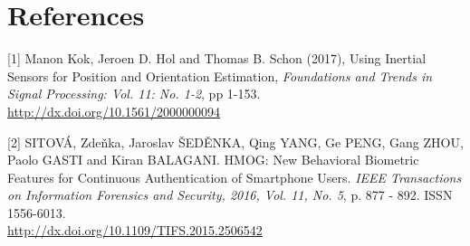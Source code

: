 \documentclass{article}
\begin{document}


\section*{References}

\small

[1] Manon Kok, Jeroen D. Hol and Thomas B. Schon (2017), Using
Inertial Sensors for Position and Orientation Estimation,
{\it Foundations and Trends in Signal Processing: Vol. 11: No. 1-2},
pp 1-153. \\ \url{http://dx.doi.org/10.1561/2000000094}

[2] SITOVÁ, Zdeňka, Jaroslav ŠEDĚNKA, Qing YANG, Ge PENG, Gang ZHOU,
Paolo GASTI and Kiran BALAGANI. HMOG: New Behavioral Biometric Features
for Continuous Authentication of Smartphone Users. {\it IEEE Transactions on
Information Forensics and Security, 2016, Vol. 11, No. 5}, p. 877 - 892.
ISSN 1556-6013. \\ \url{http://dx.doi.org/10.1109/TIFS.2015.2506542}
\end{document}
